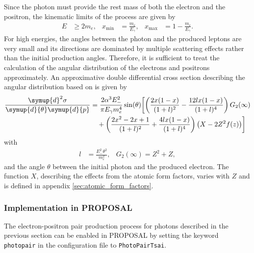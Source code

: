 Since the photon must provide the rest mass of both the electron and the positron, the kinematic limits of the process are given by
%
\begin{align}
	E &\geq 2 m_e, & x_{\text{min}} &= \frac{m_e}{E_{\gamma}}, & x_{\text{max}} &= 1 - \frac{m_e}{E_{\gamma}}.
\end{align}
%
For high energies, the angles between the photon and the produced leptons are very small and its directions are dominated by multiple scattering effects rather than the initial production angles.
Therefore, it is sufficient to treat the calculation of the angular distribution of the electrons and positrons approximately.
An approximative double differential cross section describing the angular distribution based on \cite[][Eq.~3.5]{RevModPhys.46.815} is given by
%
\begin{equation}
	\label{eqn:angular_distribution}
	\begin{split}
	\frac{\symup{d}^2\sigma}{\symup{d}{\theta}\symup{d}{p}} &= \frac{2 \alpha^3 E_{-}^2}{\pi E_{\gamma} m_e^4} \sin(\theta) \biggl[ \left( \frac{2 x (1-x)}{(1 + l)^2} - \frac{12 l x (1-x)}{(1 + l)^4} \right) G_2(\infty) \\ &\quad+ \left( \frac{2 x^2 - 2x + 1}{(1 + l)^2} + \frac{4 l x (1-x)}{(1 + l)^4} \right) \left( X - 2 Z^2 f(z) \right) \biggr]
	\end{split}
\end{equation}
%
with
%
\begin{align*}
	l &= \frac{E_-^2 \theta^2}{m_e^2}, & G_2(\infty) = Z^2 + Z,
\end{align*}
%
and the angle $\theta$ between the initial photon and the produced electron.
The function $X$, describing the effects from the atomic form factors, varies with $Z$ and is defined in appendix \ref{sec:atomic_form_factors}.

\subsubsection{Implementation in PROPOSAL}

\begin{sloppypar}
The electron-positron pair production process for photons described in the previous section can be enabled in PROPOSAL by setting the keyword \texttt{photopair} in the configuration file to \texttt{PhotoPairTsai}.
\end{sloppypar}

